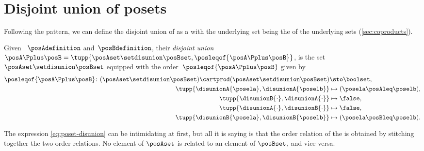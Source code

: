 
\section{Disjoint union of posets}

Following the pattern, we can define the disjoint union of  as a  with the underlying set being the  of the underlying sets (\cref{sec:coproducts}).
\begin{ctdefinition}
    \label{def:disjoint-union-of-posets}
    Given ~$\posAdefinition$ and~$\posBdefinition$, their \emph{disjoint union}~$\posA\Pplus\posB=\tupp{\posAset \setdisunion \posBset, {{\posleqof{\posA \Pplus \posB}}}}$, is the set $\posAset \setdisunion \posBset$ equipped with the order~$\posleqof{\posA \Pplus \posB}$ given by
    \begin{equation} \label{eq:poset-disunion}
        \begin{aligned}
            \posleqof{\posA\Pplus\posB}\colon
            (\posAset\setdisunion\posBset)\cartprod (\posAset
            \setdisunion\posBset)                           & \sto \boolset, \\
            \tupp{\disunionA{\posela},\disunionA{\poselb} } &
            \mapsto (\posela\posAleq \poselb), \\
            \tupp{\disunionB{\cdot},\disunionA{\cdot} }     &
            \mapsto \false, \\
            \tupp{\disunionA{\cdot},\disunionB{\cdot}}      &
            \mapsto \false, \\
            \tupp{\disunionB{\posela},\disunionB{\poselb}}  &
            \mapsto (\posela\posBleq \poselb).
        \end{aligned}
    \end{equation}
\end{ctdefinition}

The expression \cref{eq:poset-disunion} can be intimidating at first, but all it is saying is that the order relation of the  is obtained by stitching together the two order relations.
No element of $\posAset$ is related to an element of $\posBset$, and vice versa.

